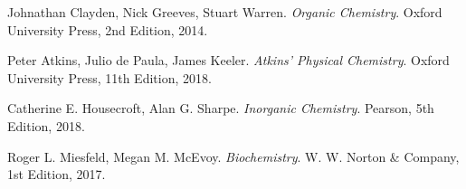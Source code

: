 \documentclass{article}
\begin{document}
\begin{multicols*}{2}
\begin{thebibliography}{9}
Johnathan Clayden, Nick Greeves, Stuart Warren.
\textit{Organic Chemistry}. 
Oxford University Press, 2nd Edition, 2014.


Peter Atkins, Julio de Paula, James Keeler.
\textit{Atkins' Physical Chemistry}.
Oxford University Press, 11th Edition, 2018.

Catherine E. Housecroft, Alan G. Sharpe.
\textit{Inorganic Chemistry}.
Pearson, 5th Edition, 2018.

Roger L. Miesfeld, Megan M. McEvoy.
\textit{Biochemistry}.
W. W. Norton \& Company, 1st Edition, 2017.
\end{thebibliography}

\end{multicols*}
\end{document}
